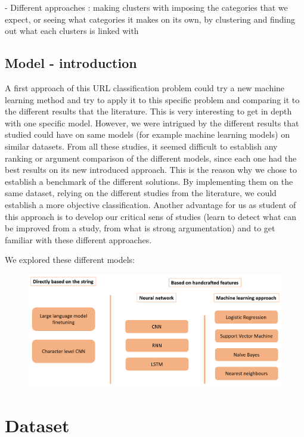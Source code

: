 \documentclass{article}
\begin{document}
    - Different approaches : making clusters with imposing the categories that we expect, or seeing what categories it makes on its own, by clustering and finding out what each clusters is linked with

    \subsection{Model - introduction}\label{subsec:model---introduction}

    A first approach of this URL classification problem could try a new machine learning method and try to apply it to this specific problem and comparing it to the different results that the literature.
    This is very interesting to get in depth with one specific model.
    However, we were intrigued by the different results that studied could have on same models (for example machine learning models) on similar datasets.
    From all these studies, it seemed difficult to establish any ranking or argument comparison of the different models, since each one had the best results on its new introduced approach.
    This is the reason why we chose to establish a benchmark of the different solutions.
    By implementing them on the same dataset, relying on the different studies from the literature, we could establish a more objective classification.
    Another advantage for us as student of this approach is to develop our critical sens of studies (learn to detect what can be improved from a study, from what is strong argumentation) and to get familiar with these different approaches.

    We explored these different models:
    \begin{figure}[H]
        \centering
        \includegraphics[width=\linewidth]{report_img/modelspresentation}
        \caption{}
        \label{fig:model_presentation}
    \end{figure}


    \section{Dataset}\label{sec:dataset}
\end{document}
